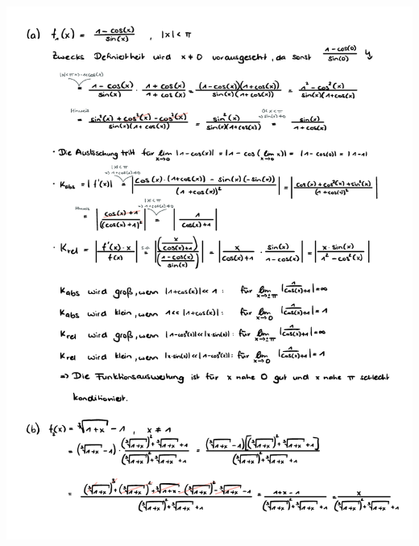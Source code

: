 \documentclass[a4paper,oneside,11pt]{scrartcl}
\begin{document}
\begin{minipage}[t]{\textwidth}
\includegraphics[scale = 0.75, page=3]{AlMa_blatt03.pdf}
\end{minipage}
\pagebreak
\end{document}
